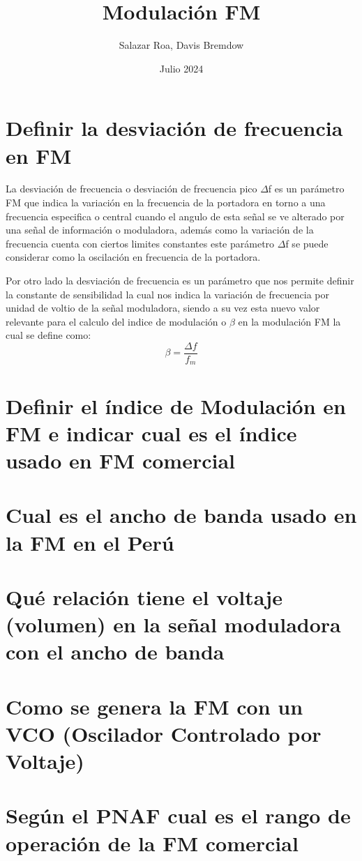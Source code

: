 \documentclass[]{article}
\title{Modulación FM}
\author{Salazar Roa, Davis Bremdow}
\date{ Julio 2024}
\begin{document}
	\maketitle
	\newpage
	
	\section{Definir la desviación de frecuencia en FM}
	La desviación de frecuencia o desviación de frecuencia pico $\Delta$f es un parámetro FM que indica la variación en la frecuencia de la portadora en torno a una frecuencia especifica o central cuando el angulo de esta señal se ve alterado por una señal de información o moduladora, además como la variación de la frecuencia cuenta con ciertos limites constantes este parámetro $\Delta$f se puede considerar como la oscilación en frecuencia de la portadora.
	
	Por otro lado la desviación de frecuencia es un parámetro que nos permite definir la constante de sensibilidad la cual nos indica la variación de frecuencia por unidad de voltio de la señal moduladora, siendo a su vez esta nuevo valor relevante para el calculo del indice de modulación o $\beta$ en la modulación FM la cual se define como: \\
	\begin{equation}
		\beta = \frac{\Delta f}{f_m}
	\end{equation}
	
	
	\section{Definir el índice de Modulación en FM e indicar cual es el índice usado en FM comercial}
	
	\section{Cual es el ancho de banda usado en la FM en el Perú}
	
	\section{Qué relación tiene el voltaje (volumen) en la señal moduladora con el ancho de banda}
	
	\section{Como se genera la FM con un VCO (Oscilador Controlado por Voltaje)}
	
	
	\section{Según el PNAF cual es el rango de operación de la FM comercial}
\end{document}

